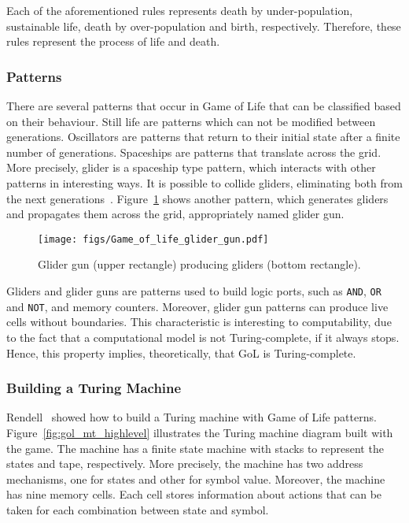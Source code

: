 \documentclass[12pt]{article}
\begin{document}
Each of the aforementioned rules represents death by under-population, sustainable life, death by over-population and birth, respectively. Therefore, these rules represent the process of life and death.

\subsubsection{Patterns}

There are several patterns that occur in Game of Life that can be classified based on their behaviour. Still life are patterns which can not be modified between generations. Oscillators are patterns that return to their initial state after a finite number of generations. Spaceships are patterns that translate across the grid. More precisely, glider is a spaceship type pattern, which interacts with other patterns in interesting ways. It is possible to collide gliders, eliminating both from the next generations~\cite{Adamatzky:book:2012}. Figure~\ref{fig:glider_gun} shows another pattern, which generates gliders and propagates them across the grid, appropriately named glider gun.

\begin{figure}[h]
    \centering
    \texttt{[image: figs/Game\_of\_life\_glider\_gun.pdf]}
    \caption{Glider gun (upper rectangle) producing gliders (bottom rectangle).}
    \label{fig:glider_gun}
\end{figure}

Gliders and glider guns are patterns used to build logic ports, such as \texttt{AND}, \texttt{OR} and \texttt{NOT}, and memory counters. Moreover, glider gun patterns can produce live cells without boundaries. This characteristic is interesting to computability, due to the fact that a computational model is not Turing-complete, if it always stops. Hence, this property implies, theoretically, that GoL is Turing-complete.

\subsubsection{Building a Turing Machine}

Rendell~\cite{Rendell:inproc:2011:jul, Rendell:phd:2014:jan} showed how to build a Turing machine with Game of Life patterns. Figure~\ref{fig:gol_mt_highlevel} illustrates the Turing machine diagram built with the game. The machine has a finite state machine with stacks to represent the states and tape, respectively. More precisely, the machine has two address mechanisms, one for states and other for symbol value. Moreover, the machine has nine memory cells. Each cell stores information about actions that can be taken for each combination between state and symbol.
\end{document}
